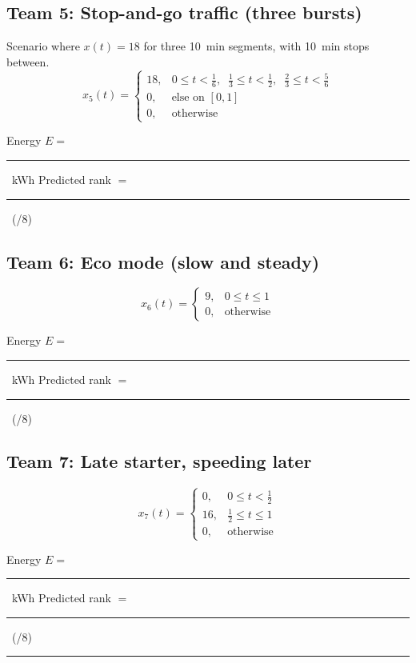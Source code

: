 \documentclass[11pt]{article}
\newcommand{\Eblank}{\rule{3cm}{0.4pt}}
\newcommand{\Rankblank}{\rule{3cm}{0.4pt}}
\begin{document}
\subsection*{Team 5: Stop-and-go traffic (three bursts)}
Scenario where $x(t) = 18$ for three \SI{10}{min} segments, with \SI{10}{min} stops between.
\[
x_5(t)=
\begin{cases}
18, & 0 \le t < \tfrac{1}{6}, \;\;\tfrac{1}{3}\le t < \tfrac{1}{2}, \;\;\tfrac{2}{3}\le t < \tfrac{5}{6} \\
0,  & \text{else on }[0,1]\\
0,  & \text{otherwise}
\end{cases}
\]
\begin{tcolorbox}[title=Team 5: Record your results]
Energy \(E=\) \Eblank\ \si{kWh} \quad\quad Predicted rank \(=\) \Rankblank\ (/8)
\end{tcolorbox}

\subsection*{Team 6: Eco mode (slow and steady)}
\[
x_6(t)=
\begin{cases}
9, & 0 \le t \le 1 \\
0, & \text{otherwise}
\end{cases}
\]
\begin{tcolorbox}[title=Team 6: Record your results]
Energy \(E=\) \Eblank\ \si{kWh} \quad\quad Predicted rank \(=\) \Rankblank\ (/8)
\end{tcolorbox}

\subsection*{Team 7: Late starter, speeding later}
\[
x_7(t)=
\begin{cases}
0, & 0 \le t < \tfrac{1}{2} \\
16, & \tfrac{1}{2} \le t \le 1 \\
0, & \text{otherwise}
\end{cases}
\]
\begin{tcolorbox}[title=Team 7: Record your results]
Energy \(E=\) \Eblank\ \si{kWh} \quad\quad Predicted rank \(=\) \Rankblank\ (/8)
\end{tcolorbox}


\bigskip
\hrule
\bigskip
\end{document}

